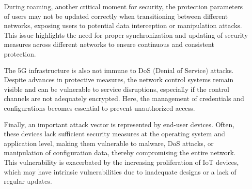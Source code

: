 \documentclass[english]{article}
\begin{document}
During roaming, another critical moment for security, the protection parameters
of users may not be updated correctly when transitioning between different
networks, exposing users to potential data interception or manipulation
attacks. This issue highlights the need for proper synchronization and updating
of security measures across different networks to ensure continuous and
consistent protection.

The 5G infrastructure is also not immune to DoS (Denial of Service) attacks.
Despite advances in protective measures, the network control systems remain
visible and can be vulnerable to service disruptions, especially if the control
channels are not adequately encrypted. Here, the management of credentials and
configurations becomes essential to prevent unauthorized access.

Finally, an important attack vector is represented by end-user devices. Often,
these devices lack sufficient security measures at the operating system and
application level, making them vulnerable to malware, DoS attacks, or
manipulation of configuration data, thereby compromising the entire network.
This vulnerability is exacerbated by the increasing proliferation of IoT
devices, which may have intrinsic vulnerabilities due to inadequate designs or
a lack of regular updates.
\end{document}
